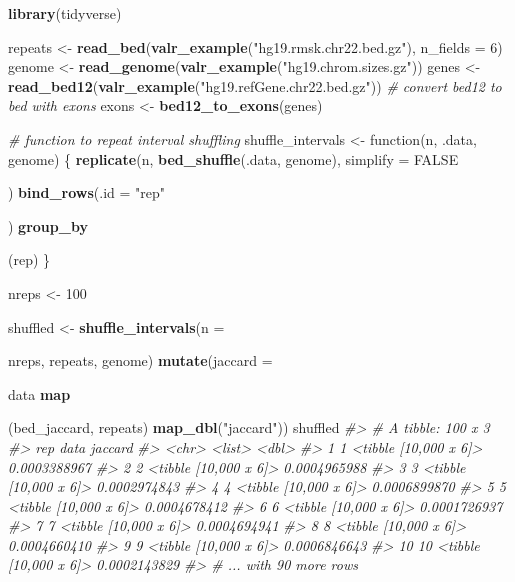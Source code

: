 \documentclass[9pt,a4paper]{extarticle}
\renewcommand{\KeywordTok}[1]{\textbf{{#1}}}
\renewcommand{\DataTypeTok}[1]{\textcolor[rgb]{0.50,0.00,0.00}{{#1}}}
\renewcommand{\DecValTok}[1]{\textcolor[rgb]{0.00,0.00,1.00}{{#1}}}
\renewcommand{\StringTok}[1]{\textcolor[rgb]{0.87,0.00,0.00}{{#1}}}
\renewcommand{\CommentTok}[1]{\textcolor[rgb]{0.50,0.50,0.50}{\textit{{#1}}}}
\renewcommand{\OtherTok}[1]{{#1}}
\renewcommand{\NormalTok}[1]{{#1}}
\begin{document}
\begin{Highlighting}[]
\KeywordTok{library}\NormalTok{(tidyverse)}

\NormalTok{repeats <-}\StringTok{ }\KeywordTok{read_bed}\NormalTok{(}\KeywordTok{valr_example}\NormalTok{(}\StringTok{"hg19.rmsk.chr22.bed.gz"}\NormalTok{), }\DataTypeTok{n_fields =} \DecValTok{6}\NormalTok{) }
\NormalTok{genome <-}\StringTok{ }\KeywordTok{read_genome}\NormalTok{(}\KeywordTok{valr_example}\NormalTok{(}\StringTok{"hg19.chrom.sizes.gz"}\NormalTok{))}
\NormalTok{genes <-}\StringTok{ }\KeywordTok{read_bed12}\NormalTok{(}\KeywordTok{valr_example}\NormalTok{(}\StringTok{"hg19.refGene.chr22.bed.gz"}\NormalTok{))}
\CommentTok{# convert bed12 to bed with exons}
\NormalTok{exons <-}\StringTok{ }\KeywordTok{bed12_to_exons}\NormalTok{(genes)}

\CommentTok{# function to repeat interval shuffling}
\NormalTok{shuffle_intervals <-}\StringTok{ }\NormalTok{function(n, .data, genome) \{}
  \KeywordTok{replicate}\NormalTok{(n, }\KeywordTok{bed_shuffle}\NormalTok{(.data, genome), }\DataTypeTok{simplify =} \OtherTok{FALSE}\NormalTok{) %
\StringTok{    }\KeywordTok{bind_rows}\NormalTok{(}\DataTypeTok{.id =} \StringTok{"rep"}\NormalTok{) %
\StringTok{    }\KeywordTok{group_by}\NormalTok{(rep) %
\NormalTok{\}}

\NormalTok{nreps <-}\StringTok{ }\DecValTok{100}

\NormalTok{shuffled <-}\StringTok{ }\KeywordTok{shuffle_intervals}\NormalTok{(}\DataTypeTok{n =} \NormalTok{nreps, repeats, genome) %
\StringTok{  }\KeywordTok{mutate}\NormalTok{(}\DataTypeTok{jaccard =} \NormalTok{data %
\StringTok{           }\KeywordTok{map}\NormalTok{(bed_jaccard, repeats) %
\StringTok{           }\KeywordTok{map_dbl}\NormalTok{(}\StringTok{"jaccard"}\NormalTok{))}
\NormalTok{shuffled}
\CommentTok{#> # A tibble: 100 x 3}
\CommentTok{#>      rep                  data      jaccard}
\CommentTok{#>    <chr>                <list>        <dbl>}
\CommentTok{#>  1     1 <tibble [10,000 x 6]> 0.0003388967}
\CommentTok{#>  2     2 <tibble [10,000 x 6]> 0.0004965988}
\CommentTok{#>  3     3 <tibble [10,000 x 6]> 0.0002974843}
\CommentTok{#>  4     4 <tibble [10,000 x 6]> 0.0006899870}
\CommentTok{#>  5     5 <tibble [10,000 x 6]> 0.0004678412}
\CommentTok{#>  6     6 <tibble [10,000 x 6]> 0.0001726937}
\CommentTok{#>  7     7 <tibble [10,000 x 6]> 0.0004694941}
\CommentTok{#>  8     8 <tibble [10,000 x 6]> 0.0004660410}
\CommentTok{#>  9     9 <tibble [10,000 x 6]> 0.0006846643}
\CommentTok{#> 10    10 <tibble [10,000 x 6]> 0.0002143829}
\CommentTok{#> # ... with 90 more rows}

}}}}}}
\end{Highlighting}
\end{document}

